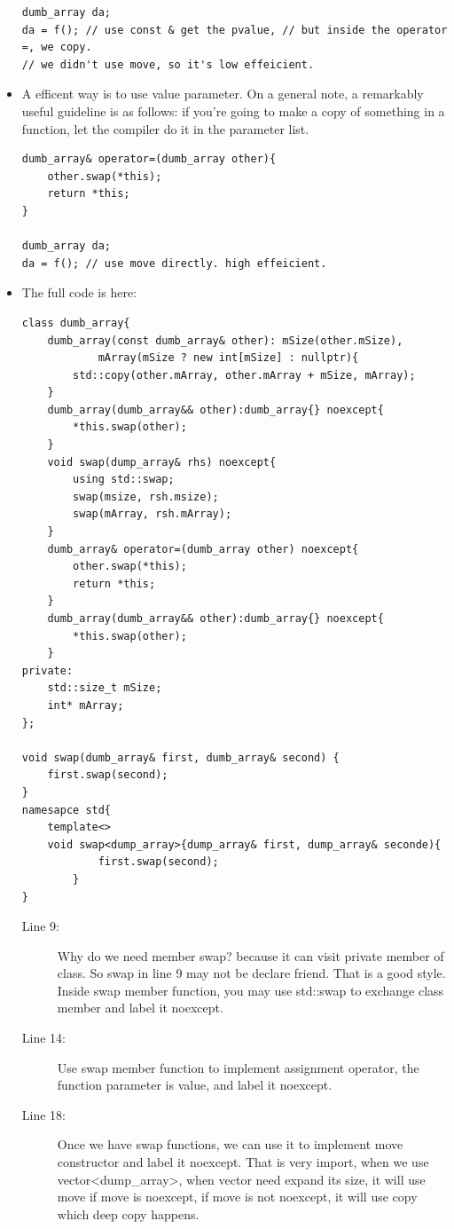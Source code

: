\documentclass[a4paper,11pt,twoside]{book}
\begin{document}
\begin{itemize}
\begin{lstlisting}[numbers=none]
dumb_array da;
da = f(); // use const & get the pvalue, // but inside the operator =, we copy. 
// we didn't use move, so it's low effeicient.	
\end{lstlisting}
	
	\item  A efficent way is to use value parameter. On a general note, a remarkably useful guideline is as follows: if you're going to make a copy of something in a function, let the compiler do it in the parameter list.
	
\begin{lstlisting}[numbers=none]
dumb_array& operator=(dumb_array other){
	other.swap(*this); 
	return *this;
}	

dumb_array da;
da = f(); // use move directly. high effeicient.
\end{lstlisting}
	

\item The full code is here: 
\begin{lstlisting}[]
class dumb_array{
	dumb_array(const dumb_array& other): mSize(other.mSize),
			mArray(mSize ? new int[mSize] : nullptr){
		std::copy(other.mArray, other.mArray + mSize, mArray);
	}
	dumb_array(dumb_array&& other):dumb_array{} noexcept{
		*this.swap(other);
	}
	void swap(dump_array& rhs) noexcept{
		using std::swap;
		swap(msize, rsh.msize);
		swap(mArray, rsh.mArray);
	}
	dumb_array& operator=(dumb_array other) noexcept{
		other.swap(*this); 
		return *this;
	}
	dumb_array(dumb_array&& other):dumb_array{} noexcept{
		*this.swap(other);
	}
private:
	std::size_t mSize;
	int* mArray;
};

void swap(dumb_array& first, dumb_array& second) {
	first.swap(second);
}
namesapce std{
	template<> 
	void swap<dump_array>{dump_array& first, dump_array& seconde){
			first.swap(second);
		}
} 
\end{lstlisting}
\begin{description}
    \item[Line 9:] Why do we need member swap? because it can visit private member of class. So swap in line 9 may not be declare friend. That is a good style. Inside swap member function, you may use std::swap to exchange class member and label it noexcept.
    
	\item[Line 14:] Use swap member function to implement assignment operator, the function parameter is value, and label it noexcept. 
	
	\item [Line 18:] Once we have swap functions, we can use it to implement move constructor and label it noexcept. That is very import, when we use vector<dump\_array>, when vector need expand its size, it will use move if move is noexcept, if move is not noexcept, it will use copy which deep copy happens. 
    

\end{description}
\end{itemize}
\end{document}
